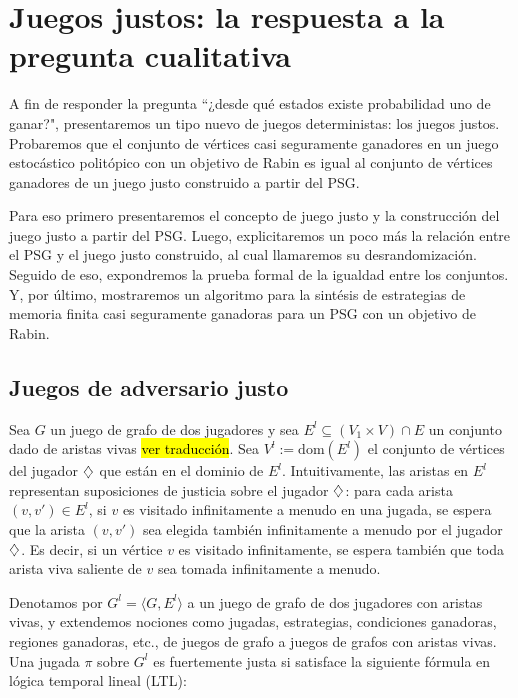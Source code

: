 \section{Juegos justos: la respuesta a la pregunta cualitativa}

A fin de responder la pregunta ``¿desde qué estados existe probabilidad uno de
ganar?", presentaremos un tipo nuevo de juegos deterministas: los juegos
justos. Probaremos que el conjunto de vértices casi seguramente ganadores en un
juego estocástico politópico con un objetivo de Rabin es igual al conjunto de
vértices ganadores de un juego justo construido a partir del PSG.

Para eso primero presentaremos el concepto de juego justo y la construcción del
juego justo a partir del PSG. Luego, explicitaremos un poco más la relación
entre el PSG y el juego justo construido, al cual llamaremos su
desrandomización. Seguido de eso, expondremos la prueba formal de la igualdad
entre los conjuntos. Y, por último, mostraremos un algoritmo para la sintésis
de estrategias de memoria finita casi seguramente ganadoras para un PSG con un
objetivo de Rabin.

\subsection{Juegos de adversario justo}

Sea $G$ un juego de grafo de dos jugadores y sea $E^{l} \subseteq (V_1 \times
	V) \cap E$ un conjunto dado de aristas vivas \hl{ver traducción}. Sea $V^{l} :=
	\mathrm{dom}(E^{l})$ el conjunto de vértices del jugador $\diamondsuit$ que están en
el dominio de $E^{l}$. Intuitivamente, las aristas en $E^{l}$ representan
suposiciones de justicia sobre el jugador $\diamondsuit$: para cada arista $(v, v')
	\in E^{l}$, si $v$ es visitado infinitamente a menudo en una jugada, se espera
que la arista $(v, v')$ sea elegida también infinitamente a menudo por el
jugador $\diamondsuit$. Es decir, si un vértice $v$ es visitado infinitamente, se
espera también que toda arista viva saliente de $v$ sea tomada infinitamente a
menudo.

Denotamos por $G^{l} = \langle G, E^{l} \rangle$ a un juego de grafo de dos
jugadores con aristas vivas, y extendemos nociones como jugadas, estrategias,
condiciones ganadoras, regiones ganadoras, etc., de juegos de grafo a juegos de
grafos con aristas vivas. Una jugada $\pi$ sobre $G^{l}$ es fuertemente justa
si satisface la siguiente fórmula en lógica temporal lineal (LTL):

